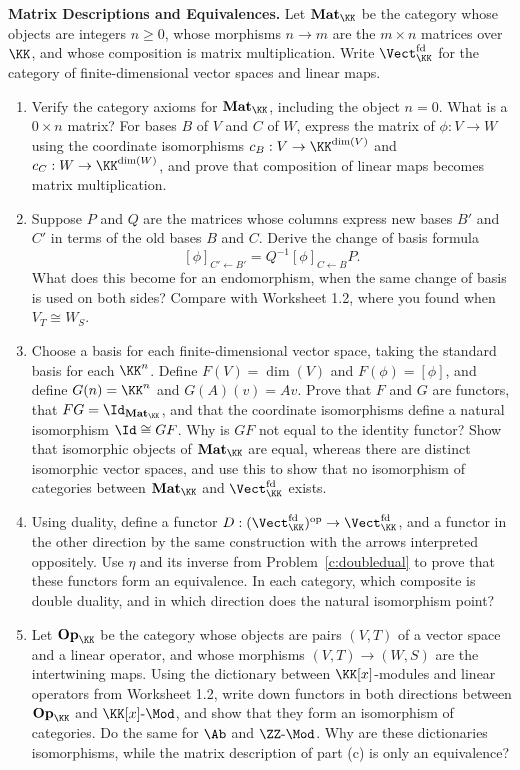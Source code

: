 \documentclass[12pt,reqno]{amsart}
\begin{document}
\begin{problems}
\item\label{c:equivalence} \textbf{Matrix Descriptions and Equivalences.} Let $\mathbf{Mat}_{\KK}$ be the category whose objects are integers $n\geq0$, whose morphisms $n\to m$ are the $m\times n$ matrices over $\KK$, and whose composition is matrix multiplication. Write $\Vect_{\KK}^{\mathrm{fd}}$ for the category of finite-dimensional vector spaces and linear maps.
\begin{enumerate}
\item Verify the category axioms for $\mathbf{Mat}_{\KK}$, including the object $n=0$. What is a $0\times n$ matrix? For bases $B$ of $V$ and $C$ of $W$, express the matrix of $\phi:V\to W$ using the coordinate isomorphisms $c_B:V\to\KK^{\dim(V)}$ and $c_C:W\to\KK^{\dim(W)}$, and prove that composition of linear maps becomes matrix multiplication.
\item Suppose $P$ and $Q$ are the matrices whose columns express new bases $B'$ and $C'$ in terms of the old bases $B$ and $C$. Derive the change of basis formula
\[
[\phi]_{C'\leftarrow B'}=Q^{-1}[\phi]_{C\leftarrow B}P.
\]
What does this become for an endomorphism, when the same change of basis is used on both sides? Compare with Worksheet 1.2, where you found when $V_T\cong W_S$.
\item Choose a basis for each finite-dimensional vector space, taking the standard basis for each $\KK^n$. Define $F(V)=\dim(V)$ and $F(\phi)=[\phi]$, and define $G(n)=\KK^n$ and $G(A)(v)=Av$. Prove that $F$ and $G$ are functors, that $FG=\Id_{\mathbf{Mat}_{\KK}}$, and that the coordinate isomorphisms define a natural isomorphism $\Id\cong GF$. Why is $GF$ not equal to the identity functor? Show that isomorphic objects of $\mathbf{Mat}_{\KK}$ are equal, whereas there are distinct isomorphic vector spaces, and use this to show that no isomorphism of categories between $\mathbf{Mat}_{\KK}$ and $\Vect_{\KK}^{\mathrm{fd}}$ exists.
\item Using duality, define a functor $D:(\Vect_{\KK}^{\mathrm{fd}})^{\mathrm{op}}\to\Vect_{\KK}^{\mathrm{fd}}$, and a functor in the other direction by the same construction with the arrows interpreted oppositely. Use $\eta$ and its inverse from Problem~\ref{c:doubledual} to prove that these functors form an equivalence. In each category, which composite is double duality, and in which direction does the natural isomorphism point?
\item Let $\mathbf{Op}_{\KK}$ be the category whose objects are pairs $(V,T)$ of a vector space and a linear operator, and whose morphisms $(V,T)\to(W,S)$ are the intertwining maps. Using the dictionary between $\KK[x]$-modules and linear operators from Worksheet 1.2, write down functors in both directions between $\mathbf{Op}_{\KK}$ and $\KK[x]\text{-}\Mod$, and show that they form an isomorphism of categories. Do the same for $\Ab$ and $\ZZ\text{-}\Mod$. Why are these dictionaries isomorphisms, while the matrix description of part (c) is only an equivalence?
\end{enumerate}
\end{problems}

\hrulefill
\end{document}
